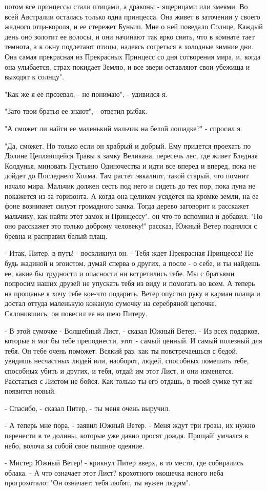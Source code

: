 потом все принцессы стали птицами, а драконы - ящерицами или змеями. 
Во всей Австралии осталась только одна принцесса. Она живет в 
заточении у своего жадного отца-короля, и ее стережет Буньип. Мне о 
ней поведало Солнце. Каждый день оно золотит ее волосы, и они начинают 
так ярко сиять, что в комнате тает темнота, а к окну подлетают птицы, 
надеясь согреться в холодные зимние дни. Она самая прекрасная из 
Прекрасных Принцесс со дня сотворения мира, и, когда она улыбается, 
страх покидает Землю, и все звери оставляют свои убежища и выходят к 
солнцу".
\par"Как же я ее прозевал, - не понимаю", - удивился я.
\par"Зато твои братья ее знают", - ответил рыбак.
\par"А сможет ли найти ее маленький мальчик на белой лошадке?" - 
спросил я.
\par"Да, сможет. Но только если он храбрый и добрый. Ему придется 
проехать по Долине Цепляющейся Травы к замку Великана, пересечь лес, 
где живет Бледная Колдунья, миновать Пустыню Одиночества и идти все 
вперед и вперед, пока не дойдет до Последнего Холма. Там растет 
эвкалипт, такой старый, что помнит начало мира. Мальчик должен сесть 
под него и сидеть до тех пор, пока луна не покажется из-за горизонта. 
А когда она целиком усядется на кромке земли, на ее фоне возникнет 
силуэт громадного замка. Тогда дерево заговорит и расскажет мальчику, 
как найти этот замок и Принцессу".
 он что-то вспомнил и добавил: "Но оно расскажет это только 
доброму человеку!"
 рассказ, Южный Ветер поднялся с бревна и расправил белый 
плащ.
\par- Итак, Питер, в путь! - воскликнул он. - Тебя ждет Прекрасная 
Принцесса! Не будь жадиной и эгоистом, думай сперва о других, а после 
- о себе, и ты найдешь ее, какие бы трудности и опасности ни 
встретились тебе. Мы с братьями попросим наших друзей не упускать тебя 
из виду и помогать во всем. А теперь на прощанье я хочу тебе кое-что 
подарить.
 Ветер опустил руку в карман плаща и достал оттуда маленькую 
кожаную сумочку на серебряной цепочке. Склонившись, он повесил ее на 
шею Питеру.
\par- В этой сумочке - Волшебный Лист, - сказал Южный Ветер. - Из всех 
подарков, которые я мог бы тебе преподнести, этот - самый ценный. И 
самый полезный для тебя. Он тебе очень поможет. Всякий раз, как ты 
повстречаешься с бедой, увидишь несчастных людей или, наоборот, людей, 
способных помешать тебе, способных убить и других, и тебя, отдай им 
этот Лист, и они изменятся. Расстаться с Листом не бойся. Как только 
ты его отдашь, в твоей сумке тут же появится новый.
\par- Спасибо, - сказал Питер, - ты меня очень выручил.
\par- А теперь мне пора, - заявил Южный Ветер. - Меня ждут три грозы, 
их нужно перенести в те долины, которые уже давно просят дождя. 
Прощай!
 умчался в небо, волоча за собой свое пышное одеяние.
\par- Мистер Южный Ветер! - крикнул Питер вверх, в то место, где 
собирались облака. - А что означает этот Лист?
 крохотного окошечка ясного неба прогрохотало: "Он означает: 
тебя любят, ты нужен людям".
